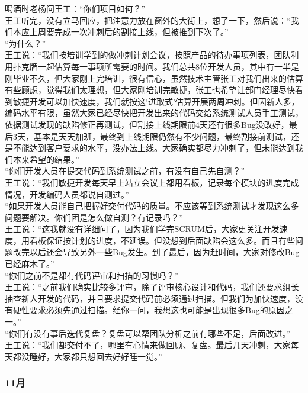 喝酒时老杨问王工：“你们项目如何？”\\
王工听完，没有立马回应，把注意力放在窗外的大街上，想了一下，然后说：“我们本应上周要完成一次冲刺后的割接上线，但被推到下次了。”\\
“为什么？”\\
王工说：“我们按培训学到的做冲刺计划会议，按照产品的待办事项列表，团队利用扑克牌一起估算每一事项所需要的时间。我们总共8位开发人员，其中有一半是刚毕业不久，但大家刚上完培训，很有信心，虽然技术主管张工对我们出来的估算有些顾虑，觉得我们太理想，但大家刚培训完敏捷，张工也希望让部门经理尽快看到敏捷开发可以加快速度，我们就按这‘进取式’估算开展两周冲刺。但因新人多，编码水平有限，虽然大家已经尽快把开发出来的代码交给系统测试人员手工测试，依据测试发现的缺陷修正再测试，但割接上线期限前4天还有很多Bug没改好，最后3天，基本是天天加班，最终到上线期限仍然有不少问题，最终割接前测试，还是不能达到客户要求的水平，没办法上线。大家确实都尽力冲刺了，但未能达到我们本来希望的结果。”\\
“你们开发人员在提交代码到系统测试之前，有没有自己先自测？”\\
王工说：“我们敏捷开发每天早上站立会议上都用看板，记录每个模块的进度完成情况，开发编码人员都说自测过。”\\
“如果开发人员能自己把握好交付代码的质量。不应该等到系统测试才发现这么多问题要解决。你们团是怎么做自测？有记录吗？”\\
王工说：“这我就没有详细问了，因为我们学完SCRUM后，大家更关注开发速度，用看板保证按计划的进度，不延误。但没想到后面缺陷会这么多。而且有些问题改完以后还会导致另外一些Bug发生。到了最后，因为赶时间，大家对修改Bug已经麻木了。”\\
“你们之前不是都有代码评审和扫描的习惯吗？”\\
王工说：“之前我们确实比较多评审，除了评审核心设计和代码，我们还要求组长抽查新人开发的代码，并且要求提交代码前必须通过扫描。但我们为加快速度，没有硬性要求必须先通过扫描。经你一问，我想这也可能是出现很多Bug的原因之一。”\\
“你们有没有事后迭代复盘？复盘可以帮团队分析之前有哪些不足，后面改进。”\\
王工说：“我们都交付不了，哪里有心情来做回顾、复盘。最后几天冲刺，大家每天都没睡好，大家都只想回去好好睡一觉。”\\

\hypertarget{ux6708-4}{%
\subsubsection{11月}\label{ux6708-4}}

